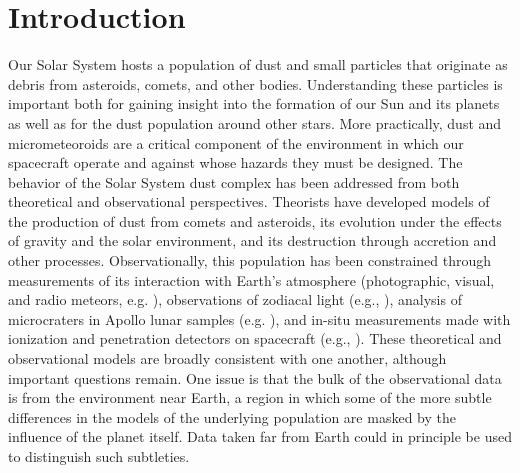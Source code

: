 \documentclass[twocolumn, trackchanges]{aastex62}
\begin{document}
\section{Introduction} \label{sec:intro}
Our Solar System hosts a population of dust and small particles that originate as debris from asteroids, comets, and other bodies.  Understanding these particles is important both for gaining insight into the formation of our Sun and its planets as well as for the dust population around other stars. More practically, dust and micrometeoroids are a critical component of the environment in which our spacecraft operate and against whose hazards they must be designed.  The behavior of the Solar System dust complex has been addressed from both theoretical and observational perspectives. Theorists have developed models of the production of dust from comets and asteroids,  its evolution under the effects of gravity and the solar environment, and its destruction through accretion and other processes. Observationally, this population has been constrained through measurements of its interaction with Earth's atmosphere (photographic, visual, and radio meteors, e.g. \cite{Halliday1984, Hawkes2007, Trigo-Rodriguez2008}), observations of zodiacal light (e.g.,  \cite{Krick2012, Durmont1980}), analysis of microcraters in Apollo lunar samples (e.g.  \cite{Allison1982}), and in-situ measurements made with ionization and penetration detectors on spacecraft (e.g.,  \cite{Weiden1978, Zhang1995}).  These theoretical and observational models are broadly consistent with one another, although important questions remain. One issue is that the bulk of the observational data is from the environment near Earth, a region in which some of the more subtle differences in the models of the underlying population are masked by the influence of the planet itself. Data taken far from Earth could in principle be used to distinguish such subtleties.
\\
\end{document}
